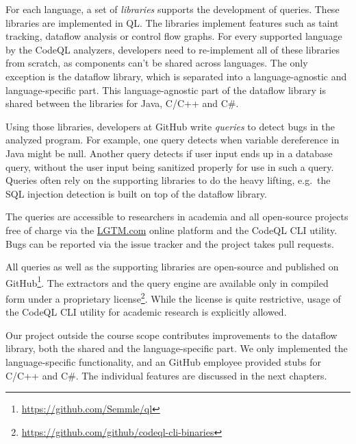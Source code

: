For each language, a set of \emph{libraries} supports the development of queries.
These libraries are implemented in QL.
The libraries implement features such as taint tracking, dataflow analysis or control flow graphs.
For every supported language by the CodeQL analyzers, developers need to re-implement all of these libraries from
scratch, as components can't be shared across languages.
The only exception is the dataflow library, which is separated into a language-agnostic and 
language-specific part.
This language-agnostic part of the dataflow library is shared between the libraries for Java, C/C++ and C\#.

Using those libraries, developers at GitHub write \emph{queries} to detect bugs in the analyzed program.
For example, one query detects when variable dereference in Java might be null.
Another query detects if user input ends up in a database query, without the user input being 
sanitized properly for use in such a query.
Queries often rely on the supporting libraries to do the heavy lifting, e.g.\ the SQL injection detection 
is built on top of the dataflow library.


The queries are accessible to researchers in academia and all open-source projects free of charge 
via the \href{https://LGTM.com}{LGTM.com} online platform and the CodeQL CLI utility. %
Bugs can be reported via the issue tracker and the project takes pull requests.


All queries as well as the supporting libraries are open-source and published 
on GitHub\footnote{\url{https://github.com/Semmle/ql}}.
The extractors and the query engine are available only in compiled form under a 
proprietary license\footnote{\url{https://github.com/github/codeql-cli-binaries}}.
While the license is quite restrictive,
usage of the CodeQL CLI utility for academic research is explicitly allowed.

Our project outside the course scope contributes improvements to the dataflow library,
both the shared and the language-specific part. We only implemented the language-specific 
functionality, and an GitHub employee provided stubs for C/C++ and C\#.
The individual features are discussed in the next chapters.


